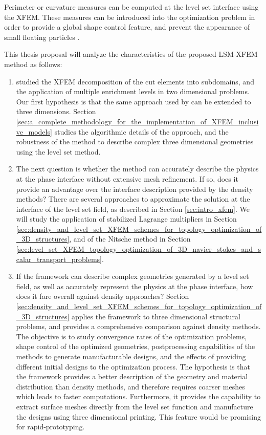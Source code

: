 Perimeter or curvature measures can be computed at the level set interface using the XFEM. These measures can be introduced into the optimization problem in order to provide a global shape control feature, and prevent the appearance of small floating particles \citep{MM:13}.

This thesis proposal will analyze the characteristics of the proposed LSM-XFEM method as follows:

\begin{enumerate}
	\item \citep{MM:13} studied the XFEM decomposition of the cut elements into subdomains, and the application of multiple enrichment levels in two dimensional problems. Our first hypothesis is that the same approach used by \citep{MM:13} can be extended to three dimensions. Section \ref{sec:a_complete_methodology_for_the_implementation_of_XFEM_inclusive_models} studies the algorithmic details of the approach, and the robustness of the method to describe complex three dimensional geometries using the level set method.

	\item The next question is whether the method can accurately describe the physics at the phase interface without extensive mesh refinement. If so, does it provide an advantage over the interface description provided by the density methods? There are several approaches to approximate the solution at the interface of the level set field, as described in Section \ref{sec:intro_xfem}. We will study the application of stabilized Lagrange multipliers in Section \ref{sec:density_and_level_set_XFEM_schemes_for_topology_optimization_of_3D_structures}, and of the Nitsche method in Section \ref{sec:level_set_XFEM_topology_optimization_of_3D_navier_stokes_and_scalar_transport_problems}.

	\item If the framework can describe complex geometries generated by a level set field, as well as accurately represent the physics at the phase interface, how does it fare overall against density approaches? Section \ref{sec:density_and_level_set_XFEM_schemes_for_topology_optimization_of_3D_structures} applies the framework to three dimensional structural problems, and provides a comprehensive comparison against density methods. The objective is to study convergence rates of the optimization problems, shape control of the optimized geometries, postprocessing capabilities of the methods to generate manufacturable designs, and the effects of providing different initial designs to the optimization process. The hypothesis is that the framework provides a better description of the geometry and material distribution than density methods, and therefore requires coarser meshes which leads to faster computations. Furthermore, it provides the capability to extract surface meshes directly from the level set function and manufacture the designs using three dimensional printing. This feature would be promising for rapid-prototyping.


\end{enumerate}
